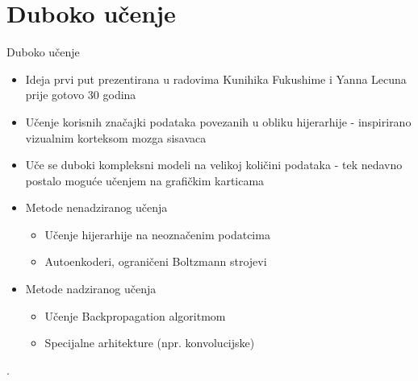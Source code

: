 \documentclass[pdf]{beamer}
\begin{document}
\section{Duboko učenje}

\begin{frame}{Duboko učenje}

\begin{itemize}
\setlength\itemsep{0.5em}

	\item Ideja prvi put prezentirana u radovima Kunihika Fukushime i Yanna Lecuna prije gotovo 30 godina

 	\item Učenje korisnih značajki podataka povezanih u obliku hijerarhije - inspirirano vizualnim korteksom mozga sisavaca

	\item Uče se duboki kompleksni modeli na velikoj količini podataka - tek nedavno postalo moguće učenjem na grafičkim karticama 
	
	\item Metode nenadziranog učenja
	\begin{itemize}
		\item Učenje hijerarhije na neoznačenim podatcima
 		\item Autoenkoderi, ograničeni Boltzmann strojevi
 	\end{itemize}
 	
 	\item Metode nadziranog učenja
	\begin{itemize}
		\item Učenje Backpropagation algoritmom
 		\item Specijalne arhitekture (npr. konvolucijske)
 	\end{itemize}
	
\end{itemize}
. 
\end{frame}
\end{document}
